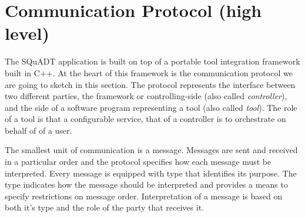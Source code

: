 \documentclass{article}
\newcommand{\squadt}{SQuADT\xspace}
\begin{document}

%
%   
%

 \section{Communication Protocol (high level)} \label{s:message_definitions}

  The \squadt application is built on top of a portable tool integration
  framework built in C++. At the heart of this framework is the communication
  protocol we are going to sketch in this section. The protocol represents the
  interface between two different parties, the framework or controlling-side
  (also called \textit{controller}), and the side of a software program
  representing a tool (also called \textit{tool}). The role of a tool is that a
  configurable service, that of a controller is to orchestrate on behalf of of
  a user.

  The smallest unit of communication is a message. Messages are sent and
  received in a particular order and the protocol specifies how each message
  must be interpreted. Every message is equipped with type that identifies its
  purpose.  The type indicates how the message should be interpreted and
  provides a means to specify restrictions on message order. Interpretation of
  a message is based on both it's type and the role of the party that receives
  it.
\end{document}
